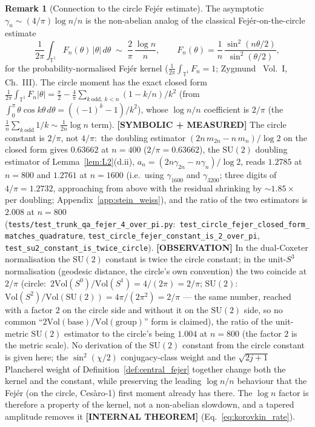 \documentclass[11pt,a4paper]{article}
\theoremstyle{plain}
\theoremstyle{definition}
\newtheorem{remark}[theorem]{Remark}
\newcommand{\sthree}{S^{3}}
\newcommand{\T}{\mathbb{T}}
\newcommand{\SU}{\mathrm{SU}}
\newcommand{\Vol}{\mathrm{Vol}}
\begin{document}
\begin{remark}[Connection to the circle Fej\'er estimate]
\label{rem:circle_fejer}
The asymptotic $\gamma_n \sim (4/\pi) \log n / n$ is the
non-abelian analog of the classical Fej\'er-on-the-circle estimate
\begin{equation}\label{eq:circle_fejer_moment}
   \frac{1}{2\pi}\int_{\T^1} F_n(\theta)\, |\theta|\, d\theta
   \;\sim\; \frac{2}{\pi}\,\frac{\log n}{n},
   \qquad
   F_n(\theta) = \frac{1}{n}\,\frac{\sin^2(n\theta/2)}{\sin^2(\theta/2)},
\end{equation}
for the probability-normalised Fej\'er kernel
($\frac{1}{2\pi}\int_{\T^1} F_n = 1$; Zygmund~\cite{zygmund2002}
Vol.~I, Ch.~III). The circle moment has the exact closed form
$\frac{1}{2\pi}\int_{\T^1} F_n|\theta| = \frac{\pi}{2} -
\frac{4}{\pi}\sum_{k\ \mathrm{odd},\,k<n}(1-k/n)/k^2$ (from
$\int_0^\pi\theta\cos k\theta\,d\theta = ((-1)^k-1)/k^2$), whose
$\log n/n$ coefficient is $2/\pi$ (the $\tfrac{1}{n}\sum_{k\ \mathrm{odd}}1/k
\sim \tfrac{1}{2n}\log n$ term). \textbf{[SYMBOLIC + MEASURED]} The circle
constant is $2/\pi$, not $4/\pi$:\ the doubling estimator
$(2n\,m_{2n} - n\,m_n)/\log 2$ on the closed form gives $0.63662$ at
$n = 400$ ($2/\pi = 0.63662$), the $\SU(2)$ doubling estimator of
Lemma~\ref{lem:L2}(d.ii), $a_n = (2n\gamma_{2n} - n\gamma_n)/\log 2$,
reads $1.2785$ at $n = 800$ and $1.2761$ at $n = 1600$ (i.e.\ using
$\gamma_{1600}$ and $\gamma_{3200}$; three digits of $4/\pi = 1.2732$,
approaching from above with the residual shrinking by ${\sim}1.85\times$
per doubling; Appendix~\ref{app:stein_weiss}), and the ratio of the two
estimators is $2.008$ at $n = 800$
(\texttt{tests/test\_trunk\_qa\_fejer\_4\_over\_pi.py}:\
\texttt{test\_circle\_fejer\_closed\_form\_matches\_quadrature},
\texttt{test\_circle\_fejer\_constant\_is\_2\_over\_pi},
\texttt{test\_su2\_constant\_is\_twice\_circle}).
\textbf{[OBSERVATION]} In the dual-Coxeter normalisation the $\SU(2)$
constant is twice the circle constant; in the unit-$\sthree$
normalisation (geodesic distance, the circle's own convention) the two
coincide at $2/\pi$ (circle:\ $2\Vol(S^0)/\Vol(S^1) = 4/(2\pi) = 2/\pi$;
$\SU(2)$:\ $\Vol(S^2)/\Vol(\SU(2)) = 4\pi/(2\pi^2) = 2/\pi$ --- the same
number, reached with a factor $2$ on the circle side and without it on
the $\SU(2)$ side, so no common ``$2\Vol(\text{base})/\Vol(\text{group})$''
form is claimed), the
ratio of the unit-metric $\SU(2)$ estimator to the circle's being
$1.004$ at $n = 800$ (the factor $2$ is the metric scale). No
derivation of the $\SU(2)$ constant from the circle constant is given
here; the $\sin^2(\chi/2)$ conjugacy-class weight and the
$\sqrt{2j+1}$ Plancherel weight of Definition~\ref{def:central_fejer}
together change both the kernel and the constant, while preserving
the leading $\log n / n$ behaviour that the Fej\'er (on the circle,
Ces\`aro-1) first moment already has there.  The $\log n$ factor is
therefore a property of the kernel, not a non-abelian slowdown, and a
tapered amplitude removes it \textbf{[INTERNAL THEOREM]} (Eq.~\eqref{eq:korovkin_rate}).
\end{remark}
\end{document}
